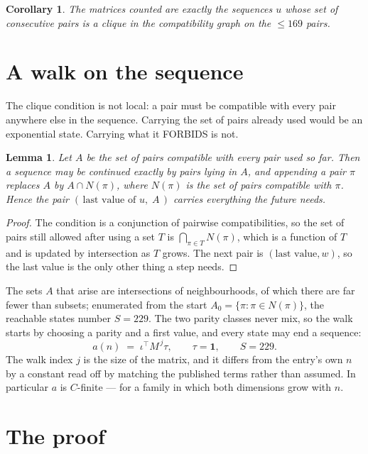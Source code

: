 \documentclass[11pt,a4paper]{article}
\theoremstyle{plain}
\newtheorem{lemma}[theorem]{Lemma}
\newtheorem{corollary}[theorem]{Corollary}
\theoremstyle{definition}
\begin{document}
\begin{corollary}
The matrices counted are exactly the sequences $u$ whose set of consecutive pairs is a clique in
the compatibility graph on the $\le 169$ pairs.
\end{corollary}

\section{A walk on the sequence}

The clique condition is not local: a pair must be compatible with every pair anywhere else in
the sequence. Carrying the set of pairs already used would be an exponential state. Carrying
what it FORBIDS is not.

\begin{lemma}\label{lem:lump}
Let $A$ be the set of pairs compatible with every pair used so far. Then a sequence may be
continued exactly by pairs lying in $A$, and appending a pair $\pi$ replaces $A$ by
$A\cap N(\pi)$, where $N(\pi)$ is the set of pairs compatible with $\pi$. Hence the pair
$(\,\text{last value of }u,\;A\,)$ carries everything the future needs.
\end{lemma}

\begin{proof}
The condition is a conjunction of pairwise compatibilities, so the set of pairs still allowed
after using a set $T$ is $\bigcap_{\pi\in T}N(\pi)$, which is a function of $T$ and is updated
by intersection as $T$ grows. The next pair is $(\text{last value},w)$, so the last value is
the only other thing a step needs.
\end{proof}

The sets $A$ that arise are intersections of neighbourhoods, of which there are far fewer than
subsets; enumerated from the start $A_0=\{\pi:\pi\in N(\pi)\}$, the reachable states number
$S=229$. The two parity classes never mix, so the walk starts by choosing a parity and a first
value, and every state may end a sequence:
\[
a(n)\;=\;\iota^{\!\top}M^{\,j}\tau ,\qquad \tau=\mathbf{1},\qquad S=229.
\]
The walk index $j$ is the size of the matrix, and it differs from the entry's own $n$ by a
constant read off by matching the published terms rather than assumed. In particular $a$ is
$C$-finite --- for a family in which both dimensions grow with $n$.

\section{The proof}
\end{document}
